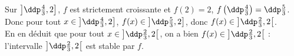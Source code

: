 \begin{correction}
\begin{enumerate}
\begin{enumerate}
Sur $\left\rbrack\ddp\frac{4}{3},2\right\rbrack$, $f$ est strictement croissante et $f\left(2\right) = 2$, $f\left(\ddp\frac{4}{3}\right)=\ddp\frac{5}{3}$. Donc pour tout $x \in \left\rbrack \ddp\frac{4}{3},2\right\rbrack$, $f(x) \in \left\rbrack \ddp\frac{5}{3},2\right\rbrack$, donc $f(x) \in \left\rbrack \ddp\frac{2}{3},2\right\lbrack$.\\
En en d\'eduit que pour tout $x \in \left\rbrack \ddp\frac{2}{3},2\right\lbrack$, on a bien $f(x) \in \left\rbrack \ddp\frac{2}{3},2\right\lbrack$ : l'intervalle $\left\rbrack \ddp\frac{2}{3},2\right\lbrack$ est stable par $f$.\\

\end{enumerate}
\end{enumerate}
\end{correction}
